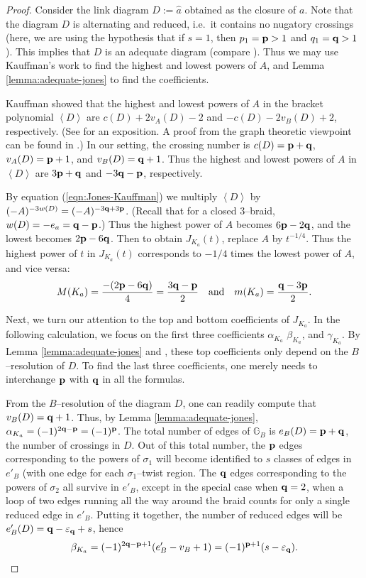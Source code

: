 \documentclass[11pt]{amsart}
\newcommand{\GB}{{\mathbb{G}_B}}
\newcommand{\p}{{\bf p}}
\newcommand{\q}{{\bf q}}
\newcommand{\eq}{\varepsilon_{\q}}
\theoremstyle{plain}
\theoremstyle{definition}
\begin{document}
\begin{proof}
Consider the link diagram $D:={\hat a}$ obtained as the closure of $a$.
Note that the diagram $D$ is 
alternating and reduced, i.e.\ it
contains no nugatory crossings (here, we are using the hypothesis that if
$s=1$, then $p_1 = \p >1$ and $q_1 = \q >1$).  This implies that $D$ is an adequate
diagram (compare \cite[Proposition 5.3]{lickbook}).  Thus we may use Kauffman's work 
to find the highest and lowest powers of $A$, and 
Lemma \ref{lemma:adequate-jones} to find the coefficients.

Kauffman showed that the highest and
lowest powers of $A$ in the bracket polynomial $\left< D\right>$ are $c(D)+2v_A(D) -2$ and
$-c(D)-2v_B(D)+2$, respectively.  (See \cite{lickbook} for an
exposition.  A proof from the graph theoretic viewpoint can be found
in \cite[Proposition 7.1]{dasbach-futer...}.) In our setting, the crossing number is $c(D)={\bf p}+{\bf q}$,  $v_A(D)={\bf p}+1$, and $v_B(D)={\bf q}+1$.
Thus the highest and lowest powers of $A$ in $\left< D \right>$ are
$3\p+\q$ and $-3\q-\p$, respectively.

By equation (\ref{eqn:Jones-Kauffman}) we multiply $\left< D \right>$
by $(-A)^{-3w(D)} = (-A)^{-3\q+3\p}$. (Recall that for a closed 3--braid, $w(D)
= -e_a={\bf q}-{\bf p}$.) Thus the highest power of $A$
becomes $6\p-2\q$, and the lowest becomes $2\p-6\q$. Then to obtain
$J_{K_a}(t)$, replace $A$ by $t^{-1/4}$.  Thus the highest power of $t$ in
$J_{K_a}(t)$ corresponds to $-1/4$ times the lowest power of $A$, and vice versa:
$$M(K_a) = \frac{-(2\p-6\q)}{4} = \frac{3\q-\p}{2}
\quad \mbox{and} \quad
m(K_a) = \frac{\q-3\p}{2}.$$

Next, we turn our attention to the top and bottom coefficients of $J_{K_a}$. In the following calculation, we 
focus on the first three coefficients $\alpha_{K_a}$ $\beta_{K_a}$, and $\gamma_{K_a}$. 
By Lemma  \ref{lemma:adequate-jones} and \cite{dasbach-lin:head-tail, 
stoimenow:amphichiral}, these top coefficients only depend on the $B$--resolution of $D$. 
To find the last three coefficients, one merely needs to interchange $\p$ with $\q$ in all the formulas.

From the $B$--resolution of the diagram $D$, one can readily compute that
$v_B(D)={\bf q}+1$. Thus, by Lemma \ref{lemma:adequate-jones},
$\alpha_{K_a} = (-1)^{2\q-\p}=(-1)^{\p}$. 
The total number of edges of $\GB$ is $e_B(D) = \p + \q$, the number of crossings in $D$. Out of this total number, the $\p$ edges corresponding to the powers of $\sigma_1$ will become identified to $s$ classes of edges in $e'_B$ (with one edge for each $\sigma_1$--twist region. The $\q$ edges corresponding to the powers of $\sigma_2$ all survive in $e'_B$, except in the special case when $\q=2$, when a loop of two edges running all the way around the braid counts for only a single reduced edge in $e'_B$.
Putting it together, the number of reduced edges will be $e'_B(D)= \q - \eq+ s$, hence
\begin{equation}\label{eq:beta}
\beta_{K_a} =(-1)^{2\q - \p+1} (e'_B - v_B + 1) = (-1)^{\p+1} (s - \eq).
\end{equation}


\end{proof}
\end{document}

